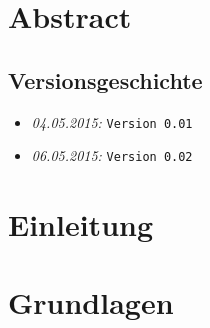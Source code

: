 \documentclass{fhnwreport/fhnwreport}
\begin{document}



\section*{Abstract}
\label{sec:abstract}



\clearpage




\tableofcontents

\vspace{80mm}
\subsection*{Versionsgeschichte}
\begin{itemize}
    \item[]
        \emph{04.05.2015:} \texttt{Version 0.01}
    \item[]
        \emph{06.05.2015:} \texttt{Version 0.02}
\end{itemize}
\clearpage



\clearpage
\section*{Einleitung}
\label{sec:einleitung}



\clearpage
\section*{Grundlagen}
\label{sec:grundlagen}

\end{document}
